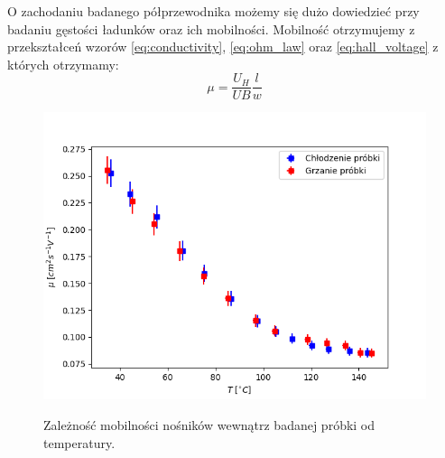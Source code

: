 \documentclass[12pt]{article}
\begin{document}
O zachodaniu badanego półprzewodnika możemy się dużo dowiedzieć przy badaniu gęstości ładunków oraz ich mobilności.
Mobilność otrzymujemy z przekształceń wzorów \ref{eq:conductivity}, \ref{eq:ohm_law} oraz \ref{eq:hall_voltage} z których otrzymamy:
\[
    \mu = \frac{U_H}{UB}\frac{l}{w}
\]
\begin{figure}
    \centering
    \includegraphics[scale=0.5]{temp_mobility}
    \label{fig:temp_mobility}
    \caption{Zależność mobilności nośników wewnątrz badanej próbki od temperatury.}
\end{figure}
\end{document}

